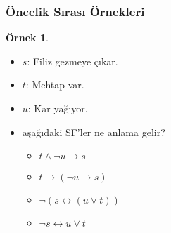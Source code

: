 \documentclass[dvipsnames]{beamer}
\theoremstyle{definition}
\theoremstyle{example}
\newtheorem{ornek}[theorem]{Örnek}
\theoremstyle{plain}
\begin{document}
\begin{frame}
  \frametitle{Öncelik Sırası Örnekleri}

  \begin{ornek}
    \begin{itemize}
      \item $s$: Filiz gezmeye çıkar.
      \item $t$: Mehtap var.
      \item $u$: Kar yağıyor.
    \end{itemize}

    \medskip
    \begin{itemize}
      \item aşağıdaki SF'ler ne anlama gelir?

      \pause
      \begin{itemize}
        \item $t \wedge \neg u \rightarrow s$
        \pause
        \item $t \rightarrow (\neg u \rightarrow s)$
        \pause
        \item $\neg (s \leftrightarrow (u \vee t))$
        \pause
        \item $\neg s \leftrightarrow u \vee t$
      \end{itemize}
    \end{itemize}
  \end{ornek}
\end{frame}
\end{document}
